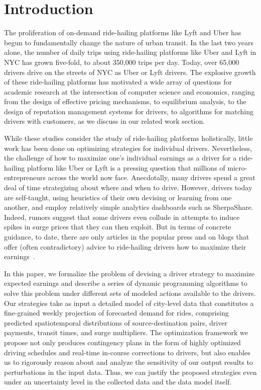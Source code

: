 
\section{Introduction}
\label{sec:introduction}

The proliferation of on-demand ride-hailing platforms like Lyft and Uber
  has begun to fundamentally change the nature of urban transit. 
In the last two years alone, the number of daily trips using ride-hailing 
  platforms like Uber and Lyft in NYC has grown five-fold, 
  to about 350,000 trips per day. 
Today, over 65,000 drivers drive on the streets of NYC as Uber or Lyft drivers.
The explosive growth of these ride-hailing platforms has motivated a wide
  array of questions for academic research at the intersection of computer
  science and economics, ranging from the design of effective pricing mechanisms, 
  to equilibrium analysis, to the design of reputation management systems for 
  drivers, to algorithms for matching drivers with 
  customers, as we discuss in our related work section.

While these studies consider the study of ride-hailing platforms holistically, 
   little work has been done on optimizing strategies for individual drivers. 
Nevertheless, the challenge of how to maximize one's individual earnings as a driver for a 
ride-hailing platform like Uber or Lyft is a pressing question that millions of micro-entrepreneurs 
across the world now face.  Anecdotally, many drivers spend a great deal of time 
strategizing about where and when to drive.  However, drivers today are 
self-taught, using heuristics of their own devising or learning from one another, 
and employ relatively simple analytics dashboards such as SherpaShare.
Indeed, rumors suggest that some drivers even collude in attempts to induce spikes in surge prices that they can then exploit.
But in terms of concrete guidance, to date, there are only articles in the
  popular press and on blogs that offer (often contradictory) advice to ride-hailing drivers 
  how to maximize their earnings~\cite{dont,tips,sherpashareNYT}.

In this paper, we formalize the problem of devising a driver strategy to maximize expected 
 earnings and describe a series of dynamic programming algorithms to solve this problem
 under different sets of modeled actions available to the drivers. 
Our strategies take as input a detailed model of city-level data that constitutes a 
  fine-grained weekly projection of forecasted demand for rides, comprising 
  predicted spatiotemporal distributions of source-destination pairs, driver payments,
  transit times, and surge multipliers. 
The optimization framework we propose not only produces contingency plans in the form of
  highly optimized driving schedules and real-time in-course corrections to drivers, but 
  also enables us to rigorously reason about and analyze the sensitivity of our output 
  results to perturbations in the input data.  
Thus, we can justify the proposed strategies even under an uncertainty level in the
  collected data and the data model itself.
  
